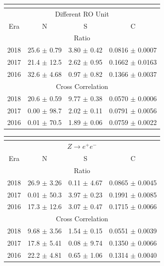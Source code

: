  \begin{center}
 \begin{tabular}{ |c|c|c|c| }
 \multicolumn{4}{c}{                            } \\
 \hline
  \multicolumn{4}{|c|}{Different RO Unit}\\
 \hline
 Era & N & S & C \\
 \hline
 \multicolumn{4}{|c|}{Ratio}\\
 \hline
 2018 & 25.6 $\pm$ 0.79 & 3.80 $\pm$ 0.42 & 0.0816 $\pm$ 0.0007 \\
 2017 & 21.4 $\pm$ 12.5 & 2.62 $\pm$ 0.95 & 0.1662 $\pm$ 0.0163 \\
 2016 & 32.6 $\pm$ 4.68 & 0.97 $\pm$ 0.82 & 0.1366 $\pm$ 0.0037 \\
 \hline
 \multicolumn{4}{|c|}{Cross Correlation}\\
 \hline
 2018 & 20.6 $\pm$ 0.59 & 9.77 $\pm$ 0.38 & 0.0570 $\pm$ 0.0006 \\
 2017 & 0.00 $\pm$ 98.7 & 2.02 $\pm$ 0.11 & 0.0791 $\pm$ 0.0056 \\
 2016 & 0.01 $\pm$ 70.5 & 1.89 $\pm$ 0.06 & 0.0759 $\pm$ 0.0022 \\
 \hline
\end{tabular}
\end{center}

\begin{center}
 \begin{tabular}{ |c|c|c|c| }
 \multicolumn{4}{c}{                            } \\
 \hline
  \multicolumn{4}{|c|}{$Z\rightarrow e^{+}e^{-}$}\\
 \hline
 Era & N & S & C \\
 \hline
 \multicolumn{4}{|c|}{Ratio}\\
 \hline
 2018 & 26.9 $\pm$ 3.26 & 0.11 $\pm$ 4.67 & 0.0865 $\pm$ 0.0045 \\
 2017 & 0.01 $\pm$ 50.3 & 3.97 $\pm$ 0.23 & 0.1991 $\pm$ 0.0085 \\
 2016 & 17.3 $\pm$ 12.6 & 3.07 $\pm$ 0.47 & 0.1715 $\pm$ 0.0066 \\
 \hline
 \multicolumn{4}{|c|}{Cross Correlation}\\
 \hline
 2018 & 9.68 $\pm$ 3.56 & 1.54 $\pm$ 0.15 & 0.0551 $\pm$ 0.0039 \\
 2017 & 17.8 $\pm$ 5.41 & 0.08 $\pm$ 9.74 & 0.1350 $\pm$ 0.0066 \\
 2016 & 22.2 $\pm$ 4.81 & 0.65 $\pm$ 1.06 & 0.1314 $\pm$ 0.0040 \\
\hline
\end{tabular}
\end{center}

\newpage